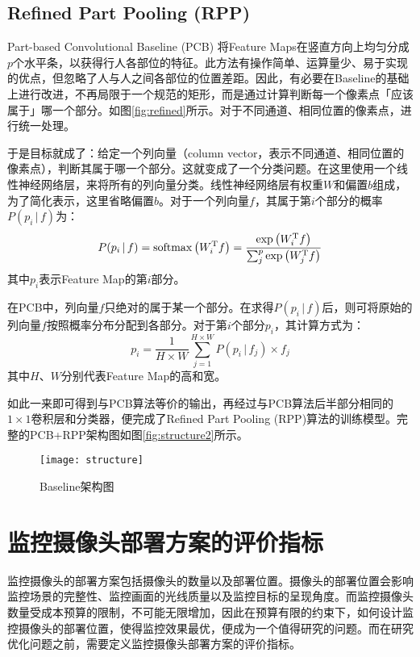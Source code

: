 \subsection{Refined Part Pooling (RPP)}
Part-based Convolutional Baseline (PCB) 将Feature Maps在竖直方向上均匀分成$p$个水平条，以获得行人各部位的特征。此方法有操作简单、运算量少、易于实现的优点，但忽略了人与人之间各部位的位置差距。因此，有必要在Baseline的基础上进行改进，不再局限于一个规范的矩形，而是通过计算判断每一个像素点「应该属于」哪一个部分。如图\ref{fig:refined}所示。对于不同通道、相同位置的像素点，进行统一处理。

于是目标就成了：给定一个列向量（column vector，表示不同通道、相同位置的像素点），判断其属于哪一个部分。这就变成了一个分类问题。在这里使用一个线性神经网络层，来将所有的列向量分类。线性神经网络层有权重$W$和偏置$b$组成，为了简化表示，这里省略偏置$b$。对于一个列向量$f$，其属于第$i$个部分的概率$P(p_i\,\vert\,f)$为：
\begin{equation}
P(p_i\,\vert\,f)=\mathop{\rm softmax}\left(W_i^{\rm T}f\right)=\frac{\exp\left(W_i^{\rm T}f\right)}{\sum_j^p\exp\left(W_j^{\rm T}f\right)}
\end{equation}
其中$p_i$表示Feature Map的第$i$部分。

在PCB中，列向量$f$只绝对的属于某一个部分。在求得$P(p_i\,\vert\,f)$后，则可将原始的列向量$f$按照概率分布分配到各部分。对于第$i$个部分$p_i$，其计算方式为：
\begin{equation}
p_i=\frac{1}{H\times W}\sum_{j=1}^{H\times W}P(p_i\,\vert\,f_j)\times f_j
\end{equation}
其中$H$、$W$分别代表Feature Map的高和宽。

如此一来即可得到与PCB算法等价的输出，再经过与PCB算法后半部分相同的$1\times1$卷积层和分类器，便完成了Refined Part Pooling (RPP)算法的训练模型。完整的PCB+RPP架构图如图\ref{fig:structure2}所示。

\begin{figure}
\centering
\texttt{[image: structure]}
\caption{Baseline架构图}
\label{fig:baseline}
\end{figure}

\section{监控摄像头部署方案的评价指标}
监控摄像头的部署方案包括摄像头的数量以及部署位置。摄像头的部署位置会影响监控场景的完整性、监控画面的光线质量以及监控目标的呈现角度。而监控摄像头数量受成本预算的限制，不可能无限增加，因此在预算有限的约束下，如何设计监控摄像头的部署位置，使得监控效果最优，便成为一个值得研究的问题。而在研究优化问题之前，需要定义监控摄像头部署方案的评价指标。

